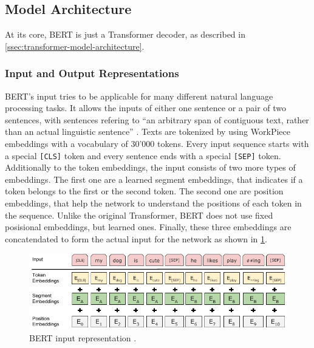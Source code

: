 \subsection{Model Architecture}

At its core, BERT is just a Transformer decoder, as described in \cref{ssec:transformer-model-architecture}.

\subsubsection{Input and Output Representations}

BERT's input tries to be applicable for many different natural language processing tasks.
It allows the inputs of either one sentence or a pair of two sentences, with sentences refering to ``an arbitrary span of contiguous text, rather than an actual linguistic sentence'' \cite[p.~4]{devlin2018bert}.
Texts are tokenized by using WorkPiece embeddings with a vocabulary of 30'000 tokens. %
Every input sequence starts with a special \texttt{[CLS]} token and every sentence ends with a special \texttt{[SEP]} token.
Additionally to the token embeddings, the input consists of two more types of embeddings.
The first one are a learned segment embeddings, that indicates if a token belongs to the first or the second token.
The second one are position embeddings, that help the network to understand the positions of each token in the sequence.
Unlike the original Transformer, BERT does not use fixed posisional embeddings, but learned ones.
Finally, these three embeddings are concatendated to form the actual input for the network as shown in \cref{fig:bert-input-representation}.

\begin{figure}[h]
\centering
\includegraphics{figures/bert-input-representation}
\caption[BERT input representation]{BERT input representation \cite[p.~5]{devlin2018bert}.}
\label{fig:bert-input-representation}
\end{figure}

